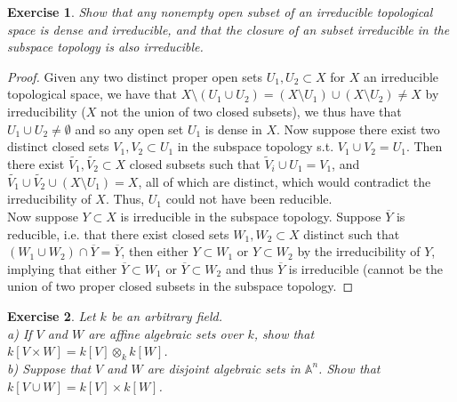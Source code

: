 \documentclass{article}
\newcommand{\bb}[1]{\mathbb{#1}}
\newtheorem{exercise}{Exercise}
\begin{document}
\begin{exercise}
  Show that any nonempty open subset of an irreducible topological space is dense and irreducible, and that the closure of an subset irreducible in the subspace topology is also irreducible.
\end{exercise}
\begin{proof}
  Given any two distinct proper open sets $U_{1}, U_{2} \subset X$ for $X$ an irreducible topological space, we have that $X \setminus (U_{1} \cup U_{2}) = (X \setminus U_{1}) \cup (X \setminus U_{2}) \neq X$ by irreducibility ($X$ not the union of two closed subsets), we thus have that $U_{1} \cup U_{2} \neq \emptyset$ and so any open set $U_{1}$ is dense in $X$. Now suppose there exist two distinct closed sets $V_{1}, V_{2} \subset U_{1}$ in the subspace topology s.t. $V_{1} \cup V_{2} = U_{1}$. Then there exist $\widetilde{V_{1}}, \widetilde{V_{2}} \subset X$ closed subsets such that $\widetilde{V}_{i}\cup U_{1} = V_{1}$, and $\widetilde{V_{1}} \cup \widetilde{V_{2}} \cup (X \setminus U_{1}) = X$, all of which are distinct, which would contradict the irreducibility of $X$. Thus, $U_{1}$ could not have been reducible. \\

  Now suppose $Y \subset X$ is irreducible in the subspace topology. Suppose $\overline{Y}$ is reducible, i.e. that there exist closed sets $W_{1}, W_{2} \subset X$ distinct such that $(W_{1} \cup W_{2}) \cap \overline{Y} = \overline{Y}$, then either $Y \subset W_{1}$ or $Y \subset W_{2}$ by the irreducibility of $Y$, implying that either $\overline{Y} \subset W_{1}$ or $\overline{Y} \subset W_{2}$ and thus $\overline{Y}$ is irreducible (cannot be the union of two proper closed subsets in the subspace topology.
\end{proof}
\begin{exercise}
  Let $k$ be an arbitrary field. \\
  a) If $V$ and $W$ are affine algebraic sets over $k$, show that $k[V \times W] =  k[V] \otimes_{k} k[W]$.\\
  b) Suppose that $V$ and $W$ are disjoint algebraic sets in $\bb{A}^{n}$. Show that $k[V \cup W] = k[V] \times k[W]$.
\end{exercise}
\end{document}
